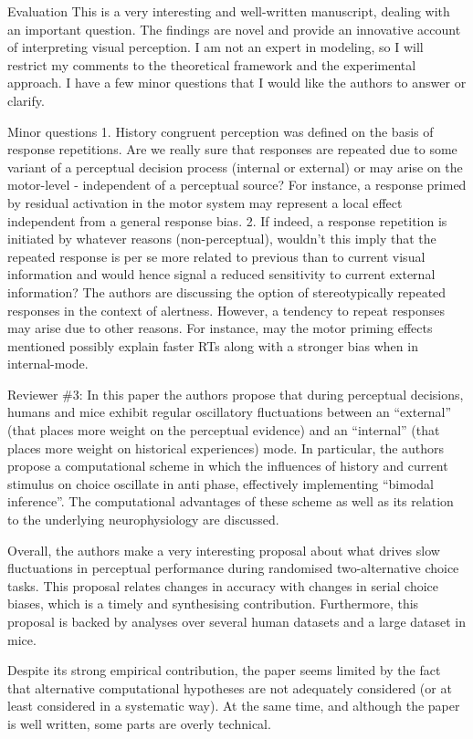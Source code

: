 \documentclass[
]{article}
\begin{document}
Evaluation This is a very interesting and well-written manuscript,
dealing with an important question. The findings are novel and provide
an innovative account of interpreting visual perception. I am not an
expert in modeling, so I will restrict my comments to the theoretical
framework and the experimental approach. I have a few minor questions
that I would like the authors to answer or clarify.

Minor questions 1. History congruent perception was defined on the basis
of response repetitions. Are we really sure that responses are repeated
due to some variant of a perceptual decision process (internal or
external) or may arise on the motor-level - independent of a perceptual
source? For instance, a response primed by residual activation in the
motor system may represent a local effect independent from a general
response bias. 2. If indeed, a response repetition is initiated by
whatever reasons (non-perceptual), wouldn't this imply that the repeated
response is per se more related to previous than to current visual
information and would hence signal a reduced sensitivity to current
external information? The authors are discussing the option of
stereotypically repeated responses in the context of alertness. However,
a tendency to repeat responses may arise due to other reasons. For
instance, may the motor priming effects mentioned possibly explain
faster RTs along with a stronger bias when in internal-mode.

Reviewer \#3: In this paper the authors propose that during perceptual
decisions, humans and mice exhibit regular oscillatory fluctuations
between an ``external'' (that places more weight on the perceptual
evidence) and an ``internal'' (that places more weight on historical
experiences) mode. In particular, the authors propose a computational
scheme in which the influences of history and current stimulus on choice
oscillate in anti phase, effectively implementing ``bimodal inference''.
The computational advantages of these scheme as well as its relation to
the underlying neurophysiology are discussed.

Overall, the authors make a very interesting proposal about what drives
slow fluctuations in perceptual performance during randomised
two-alternative choice tasks. This proposal relates changes in accuracy
with changes in serial choice biases, which is a timely and synthesising
contribution. Furthermore, this proposal is backed by analyses over
several human datasets and a large dataset in mice.

Despite its strong empirical contribution, the paper seems limited by
the fact that alternative computational hypotheses are not adequately
considered (or at least considered in a systematic way). At the same
time, and although the paper is well written, some parts are overly
technical.
\end{document}
